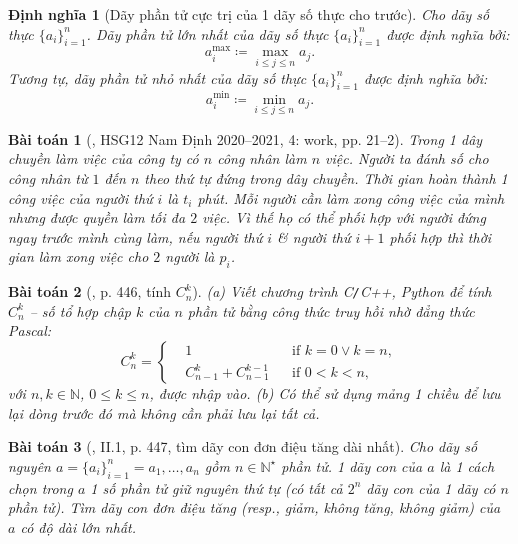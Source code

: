 \documentclass{article}
\newtheorem{baitoan}{Bài toán}
\newtheorem{dinhnghia}{Định nghĩa}
\begin{document}
\begin{dinhnghia}[Dãy phần tử cực trị của 1 dãy số thực cho trước]
	Cho dãy số thực $\{a_i\}_{i=1}^n$. {\rm Dãy phần tử lớn nhất} của dãy số thực $\{a_i\}_{i=1}^n$ được định nghĩa bởi:
	\begin{equation*}
		a_i^{\max}\coloneqq\max_{i\le j\le n} a_j.
	\end{equation*}
	Tương tự, {\rm dãy phần tử nhỏ nhất} của dãy số thực $\{a_i\}_{i=1}^n$ được định nghĩa bởi:
	\begin{equation*}
		a_i^{\min}\coloneqq\min_{i\le j\le n} a_j.
	\end{equation*}
\end{dinhnghia}

\begin{baitoan}[\cite{Trung_HSG_THPT_Tin}, HSG12 Nam Định 2020--2021, 4: work, pp. 21--2]
	Trong 1 dây chuyền làm việc của công ty có $n$ công nhân làm $n$ việc. Người ta đánh số cho công nhân từ $1$ đến $n$ theo thứ tự đứng trong dây chuyền. Thời gian hoàn thành 1 công việc của người thứ $i$ là $t_i$ phút. Mỗi người cần làm xong công việc của mình nhưng được quyền làm tối đa $2$ việc. Vì thế họ có thể phối hợp với người đứng ngay trước mình cùng làm, nếu người thứ $i$ \& người thứ $i + 1$ phối hợp thì thời gian làm xong việc cho $2$ người là $p_i$.
\end{baitoan}

\begin{baitoan}[\cite{Thu_Phuong_Tien_Triet_Phuong_KTLT}, p. 446, tính $C_n^k$]
	(a) Viết chương trình {\sf C{\tt/}C++, Python} để tính $C_n^k$ -- số tổ hợp chập $k$ của $n$ phần tử bằng công thức truy hồi nhờ đẳng thức Pascal:
	\begin{equation*}
		C_n^k = \left\{\begin{split}
			&1&&\mbox{if } k = 0\lor k = n,\\
			&C_{n-1}^k + C_{n-1}^{k-1}&&\mbox{if } 0 < k < n,
		\end{split}\right.
	\end{equation*}
	với $n,k\in\mathbb{N}$, $0\le k\le n$, được nhập vào. (b) Có thể sử dụng mảng 1 chiều để lưu lại dòng trước đó mà không cần phải lưu lại tất cả.
\end{baitoan}

\begin{baitoan}[\cite{Thu_Phuong_Tien_Triet_Phuong_KTLT}, II.1, p. 447, tìm dãy con đơn điệu tăng dài nhất]
	Cho dãy số nguyên $a = \{a_i\}_{i=1}^n = a_1,\ldots,a_n$ gồm $n\in\mathbb{N}^\star$ phần tử. 1 dãy con của $a$ là 1 cách chọn trong $a$ 1 số phần tử giữ nguyên thứ tự (có tất cả $2^n$ dãy con của 1 dãy có $n$ phần tử). Tìm dãy con đơn điệu tăng (resp., giảm, không tăng, không giảm) của $a$ có độ dài lớn nhất.
\end{baitoan}
\end{document}

